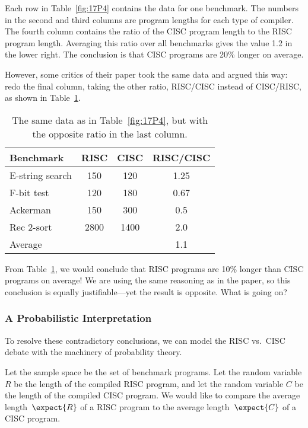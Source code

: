 Each row in Table~\ref{fig:17P4} contains the data for one benchmark.
The numbers in the second and third columns are program lengths for
each type of compiler.  The fourth column contains the ratio of the
CISC program length to the RISC program length.  Averaging this ratio
over all benchmarks gives the value 1.2 in the lower right.  The
conclusion is that CISC programs are 20\% longer on average.

However, some critics of their paper took the same data and argued this
way: redo the final column, taking the other ratio, RISC/CISC instead of
CISC/RISC, as shown in Table~\ref{fig:17P5}.

\begin{table}

\begin{tabular}{lccc}
Benchmark        & RISC          & CISC          & RISC/CISC\\
\hline
E-string search  & 150           & 120           & 1.25 \\
F-bit test       & 120           & 180           & 0.67 \\
Ackerman         & 150           & 300           & 0.5 \\
Rec 2-sort       & 2800          & 1400          & 2.0 \\
\hline
Average          &               &               & 1.1
\end{tabular}

\caption{The same data as in Table~\ref{fig:17P4}, but with the
  opposite ratio in the last column.}

\label{fig:17P5}

\end{table}

From Table~\ref{fig:17P5}, we would conclude that RISC programs are
10\% longer than CISC programs on average!  We are using the same
reasoning as in the paper, so this conclusion is equally
justifiable---yet the result is opposite.  What is going on?

\subsubsection{A Probabilistic Interpretation}

To resolve these contradictory conclusions, we can model the RISC
vs.\ CISC debate with the machinery of probability theory.

Let the sample space be the set of benchmark programs.  Let the random
variable $R$ be the length of the compiled RISC program, and let the
random variable $C$ be the length of the compiled CISC program.  We would
like to compare the average length~$\expect{R}$ of a RISC program to the
average length~$\expect{C}$ of a CISC program.

